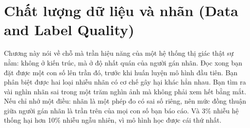 \documentclass[../../deep_learning.tex]{subfiles}
\begin{document}
\chapter{Chất lượng dữ liệu và nhãn (Data and Label Quality)}

\begin{tomtat}
Chương này nói về chỗ mà trần hiệu năng của một hệ thống thị giác thật sự nằm: không ở kiến trúc, mà ở độ nhất quán của người gán nhãn. Đọc xong bạn đặt được một con số lên trần đó, trước khi huấn luyện mô hình đầu tiên. Bạn phân biệt được hai loại nhiễu nhãn có cơ chế gây hại khác hẳn nhau. Bạn tìm ra vài nghìn nhãn sai trong một trăm nghìn ảnh mà không phải xem hết bằng mắt. Nếu chỉ nhớ một điều: nhãn là một phép đo có sai số riêng, nên mức đồng thuận giữa người gán nhãn là trần trên của mọi con số bạn báo cáo. Và 3\%
 nhiễu hệ thống hại hơn 10\%
nhiễu ngẫu nhiên, vì mô hình học được cái thứ nhất.
\end{tomtat}
\end{document}
